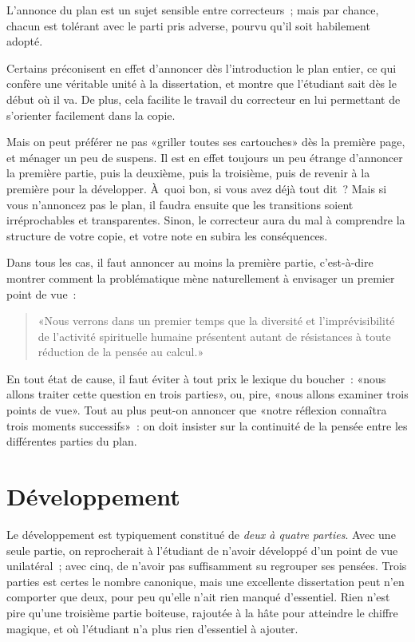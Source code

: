 \documentclass[a4paper,11pt]{article}
\newcommand{\cad}{c'est-à-dire}
\begin{document}
L'annonce du plan est un sujet sensible entre correcteurs~; mais par
chance, chacun est tolérant avec le parti pris adverse, pourvu qu'il
soit habilement adopté. 

\par

Certains préconisent en effet d'annoncer dès l'introduction le plan
entier, ce qui confère une véritable unité à la dissertation, et montre
que l'étudiant sait dès le début où il va. De plus, cela facilite le
travail du correcteur en lui permettant de s'orienter facilement dans la
copie. 

\par

Mais on peut préférer ne pas «griller toutes ses cartouches» dès la
première page, et ménager un peu de suspens. Il est en effet toujours un
peu étrange d'annoncer la première partie, puis la deuxième, puis la
troisième, puis de revenir à la première pour la développer. À~quoi bon,
si vous avez déjà tout dit~? Mais si vous n'annoncez pas le plan, il
faudra ensuite que les transitions soient irréprochables et
transparentes. Sinon, le correcteur aura du mal à comprendre la
structure de votre copie, et votre note en subira les conséquences.

\par

Dans tous les cas, il faut annoncer au moins la première partie, \cad{}
montrer comment la problématique mène naturellement à envisager un
premier point de vue~:
\begin{quote}
  «Nous verrons dans un premier temps que la diversité et
  l'imprévisibilité de l'activité spirituelle humaine présentent autant
  de résistances à toute réduction de la pensée au calcul.»
\end{quote}

\par

En tout état de cause, il faut éviter à tout prix le lexique du
boucher~: «nous allons traiter cette question en trois parties», ou,
pire, «nous allons examiner trois points de vue». Tout au plus peut-on
annoncer que «notre réflexion connaîtra trois moments successifs»~: on
doit insister sur la continuité de la pensée entre les différentes
parties du plan.


\section{Développement}

Le développement est typiquement constitué de \emph{deux à quatre
  parties}. Avec une seule partie, on reprocherait à l'étudiant de
n'avoir développé d'un point de vue unilatéral~; avec cinq, de n'avoir
pas suffisamment su regrouper ses pensées. Trois parties est certes le
nombre canonique, mais une excellente dissertation peut n'en comporter
que deux, pour peu qu'elle n'ait rien manqué d'essentiel. Rien n'est
pire qu'une troisième partie boiteuse, rajoutée à la hâte pour atteindre
le chiffre magique, et où l'étudiant n'a plus rien d'essentiel à
ajouter.
\end{document}

